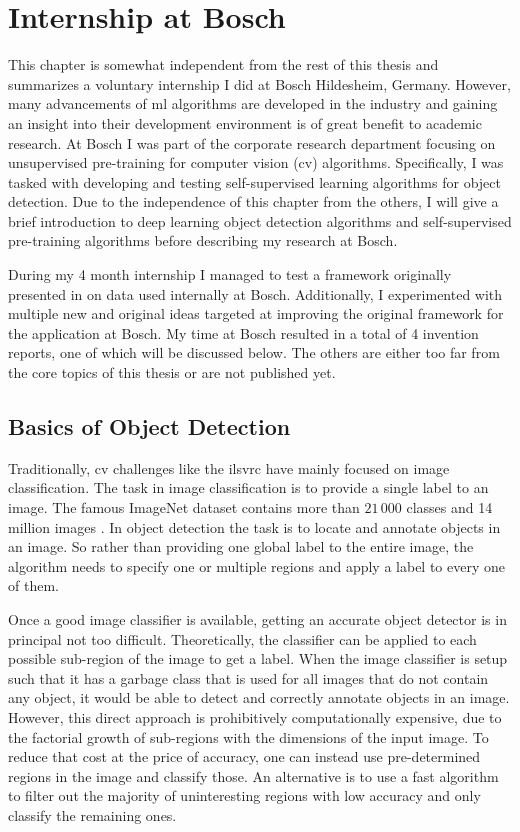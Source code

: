 \chapter{Internship at Bosch}\label{ch:bosch}
\minitoc
This chapter is somewhat independent from the rest of this thesis and summarizes a voluntary internship I did at Bosch Hildesheim, Germany. However, many advancements of \acrshort{ml} algorithms are developed in the industry and gaining an insight into their development environment is of great benefit to academic research. At Bosch I was part of the corporate research department focusing on unsupervised pre-training for computer vision (\acrshort{cv}) algorithms. Specifically, I was tasked with developing and testing self-supervised learning algorithms for object detection. Due to the independence of this chapter from the others, I will give a brief introduction to deep learning object detection algorithms and self-supervised pre-training algorithms before describing my research at Bosch.

During my 4 month internship I managed to test a framework originally presented in \cite{Wei:2021aaa} on data used internally at Bosch. Additionally, I experimented with multiple new and original ideas targeted at improving the original framework for the application at Bosch. My time at Bosch resulted in a total of 4 invention reports, one of which will be discussed below. The others are either too far from the core topics of this thesis or are not published yet.

\section{Basics of Object Detection}
Traditionally, \acrshort{cv} challenges like the \acrshort{ilsvrc} have mainly focused on image classification. The task in image classification is to provide a single label to an image. The famous ImageNet dataset contains more than $21\,000$ classes and 14 million images \cite{Fei-Fei:2022aaa}. In object detection the task is to locate and annotate objects in an image. So rather than providing one global label to the entire image, the algorithm needs to specify one or multiple regions and apply a label to every one of them.

Once a good image classifier is available, getting an accurate object detector is in principal not too difficult. Theoretically, the classifier can be applied to each possible sub-region of the image to get a label. When the image classifier is setup such that it has a garbage class that is used for all images that do not contain any object, it would be able to detect and correctly annotate objects in an image. However, this direct approach is prohibitively computationally expensive, due to the factorial growth of sub-regions with the dimensions of the input image. To reduce that cost at the price of accuracy, one can instead use pre-determined regions in the image and classify those. An alternative is to use a fast algorithm to filter out the majority of uninteresting regions with low accuracy and only classify the remaining ones.

